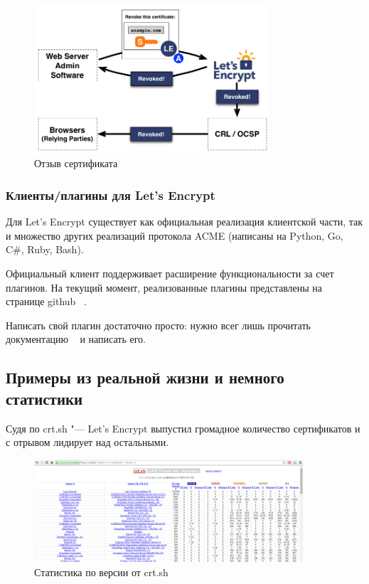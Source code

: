 \documentclass[10pt, a5paper]{article}
\begin{document}
\begin{figure}[h!]
  \centering
  \includegraphics[height=5.5cm]{w_03_2016_Kharkevich10.png}
\caption*{Отзыв сертификата}\label{fig:Kharkevich10}
\end{figure}


\subsubsection*{Клиенты/плагины для Let's Encrypt}

Для Let’s Encrypt существует как официальная реализация клиентской части, так и множество других реализаций протокола \linebreak ACME (написаны на Python, Go, C\#, Ruby, Bash).

Официальный клиент поддерживает расширение функциональности за счет плагинов. На текущий момент, реализованные плагины представлены на странице github ~\cite{Kharkevich5}.

Написать свой плагин достаточно просто: нужно всег лишь прочитать документацию ~\cite{Kharkevich6} и написать его.

\subsection*{Примеры из реальной жизни и немного статистики}

Судя по crt.sh "--- Let's Encrypt выпустил громадное количество сертификатов и с отрывом лидирует над остальными.

\begin{figure}[h!]
  \centering
  \includegraphics[width=10cm]{w_03_2016_Kharkevich11.png}
\caption*{Статистика по версии от crt.sh}\label{fig:Kharkevich11}
\end{figure}
\end{document}
